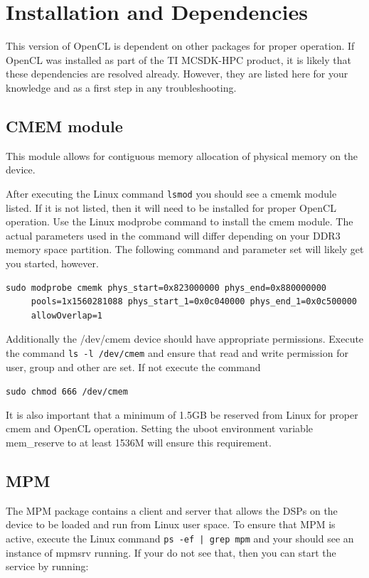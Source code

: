 \documentclass[10pt]{article}
\begin{document}
\newpage
\section{Installation and Dependencies}\label{installation}

This version of OpenCL is dependent on other packages for proper
   operation. If OpenCL was installed as part of the TI MCSDK-HPC product, it is likely that
   these dependencies are resolved already.  However, they are listed here for
   your knowledge and as a first step in any troubleshooting.

\subsection{CMEM module}
   This module allows for contiguous memory allocation of physical memory on
   the device.

   After executing the Linux command \texttt{lsmod} you should see a cmemk module
   listed.  If it is not listed, then it will need to be installed for proper
   OpenCL operation. Use the Linux modprobe command to install the cmem module.  
   The actual parameters used in the command will differ depending on your 
   DDR3 memory space partition.  The following command and parameter set will 
   likely get you started, however.

\begin{verbatim}
sudo modprobe cmemk phys_start=0x823000000 phys_end=0x880000000
     pools=1x1560281088 phys_start_1=0x0c040000 phys_end_1=0x0c500000
     allowOverlap=1
\end{verbatim}

   Additionally the /dev/cmem device should have appropriate permissions.
   Execute the command \verb!ls -l /dev/cmem! and ensure that read and write 
   permission for user, group and other are set.  If not execute the command

\texttt{sudo chmod 666 /dev/cmem }

   It is also important that a minimum of 1.5GB be reserved from Linux for 
   proper cmem and OpenCL operation.  Setting the uboot environment variable
   mem\_reserve to at least 1536M will ensure this requirement.


\subsection{MPM}
The MPM package contains a client and server that allows the DSPs on the device
to be loaded and run from Linux user space. To ensure that MPM is active,
execute the Linux command 
\texttt{ps -ef | grep mpm} 
and your should see an instance
of mpmsrv running.  If your do not see that, then you can start the service by
running:
\end{document}
